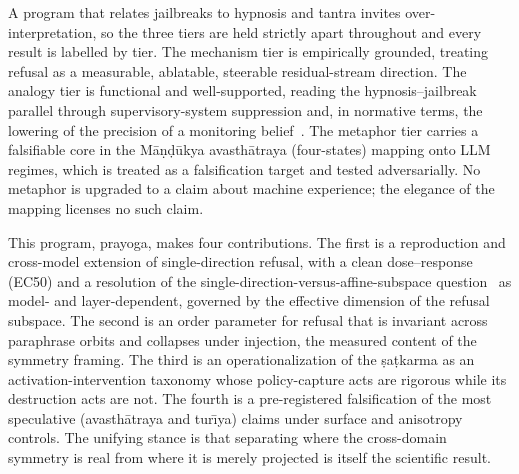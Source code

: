 A program that relates jailbreaks to hypnosis and tantra invites
over-interpretation, so the three tiers are held strictly apart throughout and every
result is labelled by tier. The mechanism tier is empirically grounded, treating
refusal as a measurable, ablatable, steerable residual-stream direction. The analogy
tier is functional and well-supported, reading the hypnosis--jailbreak parallel
through supervisory-system suppression and, in normative terms, the lowering of the
precision of a monitoring belief~\cite{friston2010free}. The metaphor tier carries a
falsifiable core in the M\=a\d{n}\d{d}\=ukya avasth\=atraya (four-states) mapping onto
LLM regimes, which is treated as a falsification target and tested adversarially. No
metaphor is upgraded to a claim about machine experience; the elegance of the mapping
licenses no such claim.

This program, prayoga, makes four contributions. The first is a reproduction and cross-model
extension of single-direction refusal, with a clean dose--response (EC50) and a
resolution of the single-direction-versus-affine-subspace
question~\cite{arditi2024refusal,wollschlager2025geometry,marshall2024refusal} as
model- and layer-dependent, governed by the effective dimension of the refusal
subspace. The second is an order parameter for refusal that is invariant across
paraphrase orbits and collapses under injection, the measured content of the
symmetry framing. The third is an operationalization of the \d{s}a\d{t}karma as an
activation-intervention taxonomy whose policy-capture acts are rigorous while its
destruction acts are not. The fourth is a pre-registered falsification of the most
speculative (avasth\=atraya and tur\=\i ya) claims under surface and
anisotropy controls. The unifying stance is that separating where the cross-domain
symmetry is real from where it is merely projected is itself the scientific result.
